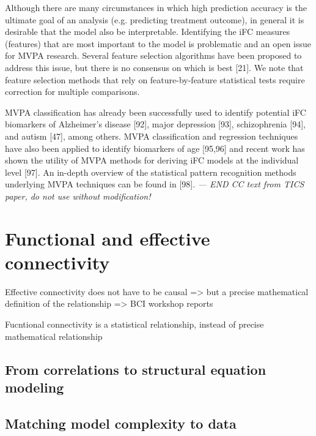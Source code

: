 \documentclass[5p]{elsarticle}
\begin{document}
Although there are many circumstances in which high prediction accuracy is the ultimate goal of an
analysis (e.g. predicting treatment outcome), in general it is desirable that the model also be
interpretable. Identifying the iFC measures (features) that are most important to the model is
problematic and an open issue for MVPA research. Several feature selection algorithms have been proposed
to address this issue, but there is no consensus on which is best [21]. We note that feature selection
methods that rely on feature-by-feature statistical tests require correction for multiple comparisons. 

MVPA classification has already been successfully used to identify potential iFC biomarkers of Alzheimer’s
disease [92], major depression [93], schizophrenia [94], and autism [47], among others. MVPA
classification and regression techniques have also been applied to identify biomarkers of age [95,96]
and recent work has shown the utility of MVPA methods for deriving iFC models at the individual
level [97]. An in-depth overview of the statistical pattern recognition methods underlying MVPA
techniques can be found in [98].
\emph{ --- END CC text from TICS paper, do not use without modification!}



\section{Functional and effective connectivity}

Effective connectivity does not have to be causal => but a precise mathematical
definition of the relationship => BCI workshop reports

Fucntional connectivity is a statistical relationship, instead of precise mathematical
relationship

\subsection{From correlations to structural equation modeling}

\cite{mcintosh1994}
\cite{marrelec2007}
\cite{marrelec2009}

\subsection{Matching model complexity to data}
\end{document}
